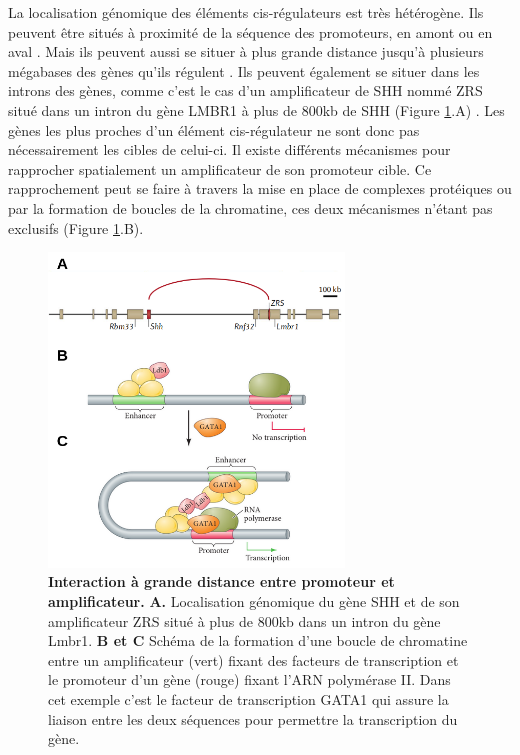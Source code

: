 La localisation génomique des éléments \gls{cis}-régulateurs est très hétérogène. Ils peuvent être situés à proximité de la séquence des promoteurs, en amont ou en aval \citep{maniatis_regulation_1987}. Mais ils peuvent aussi se situer à plus grande distance jusqu’à plusieurs mégabases des gènes qu’ils régulent \citep{visel_chip-seq_2009}. Ils peuvent également se situer dans les introns des gènes, comme c’est le cas d’un \gls{amplificateur} de \acrshort{SHH} nommé \acrshort{ZRS} situé dans un intron du gène LMBR1 à plus de 800kb de \acrshort{SHH} (Figure \ref{fig:Fig6}.A) \citep{lettice_long-range_2003}. Les gènes les plus proches d’un élément \gls{cis}-régulateur ne sont donc pas nécessairement les cibles de celui-ci. Il existe différents mécanismes pour rapprocher spatialement un \gls{amplificateur} de son promoteur cible. Ce rapprochement peut se faire à travers la mise en place de complexes protéiques ou par la formation de boucles de la chromatine, ces deux mécanismes n’étant pas exclusifs (Figure \ref{fig:Fig6}.B).\\

\begin{figure}[h]
    \centering
    \includegraphics[width=0.7\textwidth, page=1] {figures/introduction/fig6.png}
    \caption[Interaction à grande distance entre promoteur et \gls{amplificateur}.]{
    \textbf{Interaction à grande distance entre promoteur et \gls{amplificateur}.}
    \textbf{A.} Localisation génomique du gène \acrshort{SHH} et de son \gls{amplificateur} \acrshort{ZRS} situé à plus de 800kb dans un intron du gène Lmbr1.
    \textbf{B et C} Schéma de la formation d'une boucle de chromatine entre un \gls{amplificateur} (vert)  fixant des facteurs de transcription et le promoteur d'un gène (rouge) fixant l'\acrshort{ARN} polymérase II. Dans cet exemple c'est le facteur de transcription GATA1 qui assure la liaison entre les deux séquences pour permettre la transcription du gène.\\
    }
    \label{fig:Fig6}
\end{figure}

